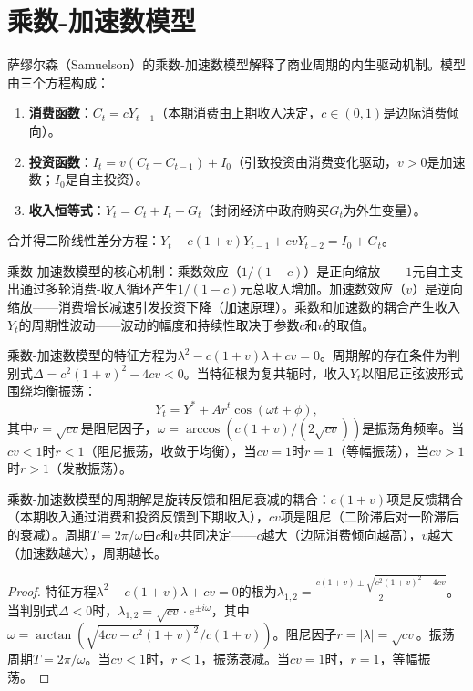 \section{乘数-加速数模型}

\begin{definition}[乘数-加速数模型]\label{def:multiplier_accelerator}
萨缪尔森（Samuelson）的乘数-加速数模型解释了商业周期的内生驱动机制。模型由三个方程构成：
\begin{enumerate}[label=(\roman*)]
    \item \textbf{消费函数}：$C_t = cY_{t-1}$（本期消费由上期收入决定，$c \in (0,1)$是边际消费倾向）。
    \item \textbf{投资函数}：$I_t = v(C_t - C_{t-1}) + I_0$（引致投资由消费变化驱动，$v > 0$是加速数；$I_0$是自主投资）。
    \item \textbf{收入恒等式}：$Y_t = C_t + I_t + G_t$（封闭经济中政府购买$G_t$为外生变量）。
\end{enumerate}
合并得二阶线性差分方程：$Y_t - c(1+v)Y_{t-1} + cvY_{t-2} = I_0 + G_t$。

乘数-加速数模型的核心机制：乘数效应（$1/(1-c)$）是正向缩放——$1$元自主支出通过多轮消费-收入循环产生$1/(1-c)$元总收入增加。加速数效应（$v$）是逆向缩放——消费增长减速引发投资下降（加速原理）。乘数和加速数的耦合产生收入$Y_t$的周期性波动——波动的幅度和持续性取决于参数$c$和$v$的取值。
\end{definition}

\begin{proposition}[乘数-加速数模型的周期解]\label{prop:mult_acc_periodic}
乘数-加速数模型的特征方程为$\lambda^2 - c(1+v)\lambda + cv = 0$。周期解的存在条件为判别式$\Delta = c^2(1+v)^2 - 4cv < 0$。当特征根为复共轭时，收入$Y_t$以阻尼正弦波形式围绕均衡振荡：
\[
Y_t = Y^* + Ar^t\cos(\omega t + \phi),
\]
其中$r = \sqrt{cv}$是阻尼因子，$\omega = \arccos(c(1+v)/(2\sqrt{cv}))$是振荡角频率。当$cv < 1$时$r < 1$（阻尼振荡，收敛于均衡），当$cv = 1$时$r = 1$（等幅振荡），当$cv > 1$时$r > 1$（发散振荡）。

乘数-加速数模型的周期解是旋转反馈和阻尼衰减的耦合：$c(1+v)$项是反馈耦合（本期收入通过消费和投资反馈到下期收入），$cv$项是阻尼（二阶滞后对一阶滞后的衰减）。周期$T = 2\pi/\omega$由$c$和$v$共同决定——$c$越大（边际消费倾向越高），$v$越大（加速数越大），周期越长。
\end{proposition}

\begin{proof}
特征方程$\lambda^2 - c(1+v)\lambda + cv = 0$的根为$\lambda_{1,2} = \frac{c(1+v) \pm \sqrt{c^2(1+v)^2 - 4cv}}{2}$。当判别式$\Delta < 0$时，$\lambda_{1,2} = \sqrt{cv} \cdot e^{\pm i\omega}$，其中$\omega = \arctan(\sqrt{4cv - c^2(1+v)^2} / c(1+v))$。阻尼因子$r = |\lambda| = \sqrt{cv}$。振荡周期$T = 2\pi/\omega$。当$cv < 1$时，$r < 1$，振荡衰减。当$cv = 1$时，$r = 1$，等幅振荡。
\end{proof}

